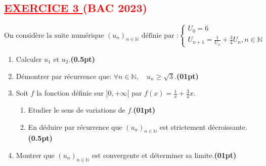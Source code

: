 \documentclass{article}
\begin{document}
\subsection*{\textcolor{red}{\underline{EXERCICE 3 } (BAC 2023) }}
\[
\text{On considère la suite numérique } (u_n)_{n \in \mathbb{N}} \text{ définie par :}
\begin{cases}
U_{0}=6\\
U_{n+1}=\frac{1}{U_{n}}+\frac{3}{4}U_{n}, n\in\mathbb{N}
\end{cases}
\]
\begin{enumerate}
\item[1)] Calculer \( u_1 \) et \( u_2 \).\hfill\textbf{(0.5pt)}

\item[2)] Démontrer par récurrence que: \( \forall n\in\mathbb{N},\quad u_n \geq \sqrt{3} \).\hfill\textbf{(01pt)}

\item[3)] Soit $f$ la fonction définie sur $]0, +\infty[$ par \( f(x) = \frac{1}{x} + \frac{3}{4}x \).
\begin{enumerate}
\item[a)] Etudier le sens de variations de $f$.\hfill\textbf{(01pt)}
\item[b)] En déduire par récurrence que $(u_n)_{n \in \mathbb{N}}$ est strictement décroissante.\hfill\textbf{(0.5pt)}
\end{enumerate}

\item[4)] Montrer que $(u_n)_{n \in \mathbb{N}}$ est convergente et déterminer sa limite.\hfill\textbf{(01pt)}

\end{enumerate}
\end{document}
